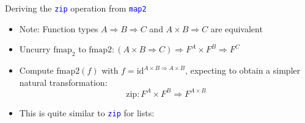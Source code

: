 \documentclass[english]{beamer}
\begin{document}
\begin{frame}{Deriving the \texttt{\textcolor{blue}{\footnotesize{}zip}} operation
from \texttt{\textcolor{blue}{\footnotesize{}map2}} }
\begin{itemize}
\item Note: Function types $A\Rightarrow B\Rightarrow C$ and $A\times B\Rightarrow C$
are equivalent
\item Uncurry $\text{fmap}_{2}$ to $\text{fmap2}:\left(A\times B\Rightarrow C\right)\Rightarrow F^{A}\times F^{B}\Rightarrow F^{C}$ 
\item Compute $\text{fmap2}\left(f\right)$ with $f=\text{id}^{A\times B\Rightarrow A\times B}$,
expecting to obtain a simpler natural transformation: 
\[
\text{zip}:F^{A}\times F^{B}\Rightarrow F^{A\times B}
\]
 
\item This is quite similar to \texttt{\textcolor{blue}{\footnotesize{}zip}}
for lists:


\end{itemize}
\end{frame}
\end{document}
